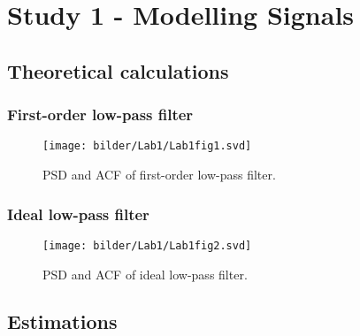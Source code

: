 \section{Study 1 - Modelling Signals}


\subsection{Theoretical calculations}


\subsubsection{First-order low-pass filter}

\begin{figure}[!ht]
\centering
\texttt{[image: bilder/Lab1/Lab1fig1.svd]}
\caption{PSD and ACF of first-order low-pass filter.}
\label{fig:Lab1fig1}
\end{figure}


\subsubsection{Ideal low-pass filter}

\begin{figure}[!ht]
\centering
\texttt{[image: bilder/Lab1/Lab1fig2.svd]}
\caption{PSD and ACF of ideal low-pass filter.}
\label{fig:Lab1fig2}
\end{figure}


\subsection{Estimations}

